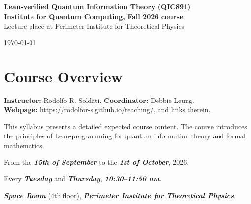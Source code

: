 \documentclass[11pt,a4paper]{article}
\newcommand{\lean}{{Lean}}
\begin{document}

\noindent
\LARGE\textbf{\lean-verified Quantum Information Theory (QIC891)}\\
\large\textbf{Institute for Quantum Computing, Fall 2026 course}\\
Lecture place at Perimeter Institute for Theoretical Physics

\begin{center}
    \today
\end{center}

\normalsize
\section*{Course Overview}

\textbf{Instructor:} Rodolfo R. Soldati. \textbf{Coordinator:} Debbie Leung.\\
\textbf{Webpage:} \url{https://rodolfor-s.github.io/teaching/}, and links
therein.

This syllabus presents a detailed expected course content. The course introduces
the principles of \lean-programming for quantum information theory and formal
mathematics.

From the \textbf{\emph{15th of September}} to the \textbf{\emph{1st of
October}}, 2026.

Every \textbf{\emph{Tuesday}} and \textbf{\emph{Thursday}},
\textbf{\emph{10:30--11:50 am}}.

\textbf{\emph{Space Room}} (4th floor), \textbf{\emph{Perimeter Institute for
Theoretical Physics}}.

\vspace{1em}
\end{document}
